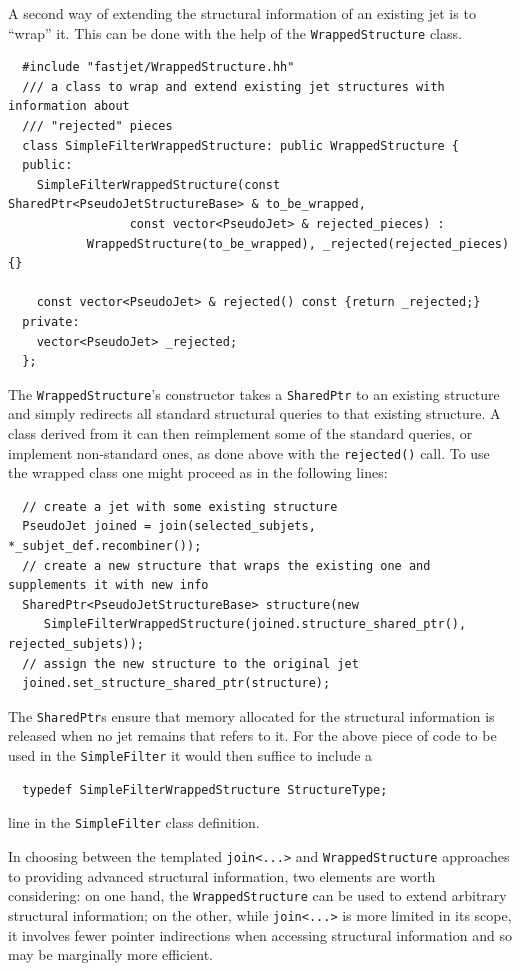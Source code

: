 \documentclass[12pt,a4]{article}
\newcommand{\ttt}[1]{{\small\texttt{#1}}}
\begin{document}
A second way of extending the structural information of an existing
jet is to ``wrap'' it. This can be done with the help of the
\ttt{WrappedStructure} class.
%
\begin{lstlisting}
  #include "fastjet/WrappedStructure.hh"
  /// a class to wrap and extend existing jet structures with information about 
  /// "rejected" pieces
  class SimpleFilterWrappedStructure: public WrappedStructure {
  public:
    SimpleFilterWrappedStructure(const SharedPtr<PseudoJetStructureBase> & to_be_wrapped,
				 const vector<PseudoJet> & rejected_pieces) :
	       WrappedStructure(to_be_wrapped), _rejected(rejected_pieces) {}
  
    const vector<PseudoJet> & rejected() const {return _rejected;}
  private:
    vector<PseudoJet> _rejected;
  };
\end{lstlisting}
The \ttt{WrappedStructure}'s constructor takes a \ttt{SharedPtr} to an
existing structure and simply redirects all standard structural
queries to that existing structure. A class derived from it can then
reimplement some of the standard queries, or implement non-standard
ones, as done above with the \ttt{rejected()} call.
%
To use the wrapped class one might proceed as in the following lines:
\begin{lstlisting}
  // create a jet with some existing structure
  PseudoJet joined = join(selected_subjets, *_subjet_def.recombiner());
  // create a new structure that wraps the existing one and supplements it with new info
  SharedPtr<PseudoJetStructureBase> structure(new
     SimpleFilterWrappedStructure(joined.structure_shared_ptr(), rejected_subjets));
  // assign the new structure to the original jet
  joined.set_structure_shared_ptr(structure);  
\end{lstlisting}
The \ttt{SharedPtr}s ensure that memory allocated for the structural
information is released when no jet remains that refers to it.
%
For the above piece of code to be used in the \ttt{SimpleFilter} it
would then suffice to include a
\begin{lstlisting}
  typedef SimpleFilterWrappedStructure StructureType;
\end{lstlisting}
line in the \ttt{SimpleFilter} class definition.

In choosing between the templated \ttt{join<...>} and
\ttt{WrappedStructure} approaches to providing advanced structural
information, two elements are worth considering: on one hand, the
\ttt{WrappedStructure} can be used to extend arbitrary structural
information; on the other, while \ttt{join<...>} is more limited in
its scope, it involves fewer pointer indirections when accessing
structural information and so may be marginally more efficient.
\end{document}
